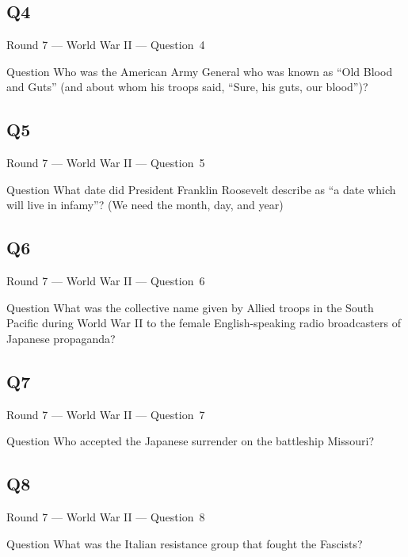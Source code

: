 \documentclass[11pt]{beamer}
\begin{document}
\subsection*{Q4}
\begin{frame}[t]{Round 7 --- World War II --- \mbox{Question 4}}
\vspace{-0.5em}
\begin{block}{Question}
Who was the American Army General who was known as ``Old Blood and Guts'' (and about whom his troops said, ``Sure, his guts, our blood'')?
\end{block}
\end{frame}
\subsection*{Q5}
\begin{frame}[t]{Round 7 --- World War II --- \mbox{Question 5}}
\vspace{-0.5em}
\begin{block}{Question}
What date did President Franklin Roosevelt describe as ``a date which will live in infamy''? (We need the month, day, and year)
\end{block}
\end{frame}
\subsection*{Q6}
\begin{frame}[t]{Round 7 --- World War II --- \mbox{Question 6}}
\vspace{-0.5em}
\begin{block}{Question}
What was the collective name given by Allied troops in the South Pacific during World War II to the female English-speaking radio broadcasters of Japanese propaganda?
\end{block}
\end{frame}
\subsection*{Q7}
\begin{frame}[t]{Round 7 --- World War II --- \mbox{Question 7}}
\vspace{-0.5em}
\begin{block}{Question}
Who accepted the Japanese surrender on the battleship Missouri?
\end{block}
\end{frame}
\subsection*{Q8}
\begin{frame}[t]{Round 7 --- World War II --- \mbox{Question 8}}
\vspace{-0.5em}
\begin{block}{Question}
What was the Italian resistance group that fought the Fascists?
\end{block}
\end{frame}
\end{document}
